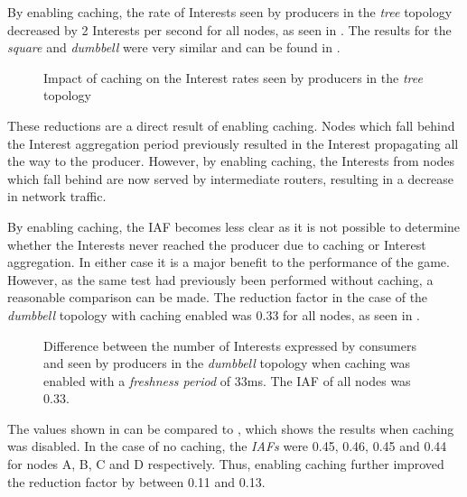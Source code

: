By enabling caching, the rate of Interests seen by producers in the \textit{tree} topology decreased by 2 Interests per second for all nodes, as seen in . The results for the \textit{square} and \textit{dumbbell} were very similar and can be found in .

\begin{figure}[H]
    \centering
    \caption{Impact of caching on the Interest rates seen by producers in the \textit{tree} topology}
    \label{fig:eval:caching:interest-impact-tree}
\end{figure}

These reductions are a direct result of enabling caching. Nodes which fall behind the Interest aggregation period previously resulted in the Interest propagating all the way to the producer. However, by enabling caching, the Interests from nodes which fall behind are now served by intermediate routers, resulting in a decrease in network traffic.

By enabling caching, the IAF becomes less clear as it is not possible to determine whether the Interests never reached the producer due to caching or Interest aggregation. In either case it is a major benefit to the performance of the game. However, as the same test had previously been performed without caching, a reasonable comparison can be made. The reduction factor in the case of the \textit{dumbbell} topology with caching enabled was 0.33 for all nodes, as seen in .  

\begin{figure}[H]
    \centering
    \caption{Difference between the number of Interests expressed by consumers and seen by producers in the \textit{dumbbell} topology when caching was enabled with a \textit{freshness period} of 33ms. The IAF of all nodes was 0.33.}
    \label{fig:eval:caching:interest-agg-dumbbell}
\end{figure}

The values shown in  can be compared to , which shows the results when caching was disabled. In the case of no caching, the \textit{IAFs} were 0.45, 0.46, 0.45 and 0.44 for nodes A, B, C and D respectively. Thus, enabling caching further improved the reduction factor by between 0.11 and 0.13.

